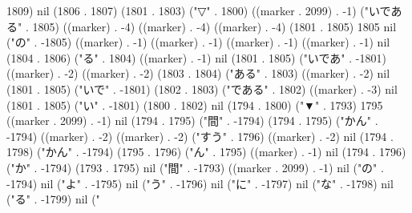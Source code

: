 1809) nil (1806 . 1807) (1801 . 1803) ("▽" . 1800) ((marker . 2099) . -1) ("いである" . 1805) ((marker) . -4) ((marker) . -4) ((marker) . -4) (1801 . 1805) 1805 nil ("の" . -1805) ((marker) . -1) ((marker) . -1) ((marker) . -1) ((marker) . -1) nil (1804 . 1806) ("る" . 1804) ((marker) . -1) nil (1801 . 1805) ("いであ" . -1801) ((marker) . -2) ((marker) . -2) (1803 . 1804) ("ある" . 1803) ((marker) . -2) nil (1801 . 1805) ("いで" . -1801) (1802 . 1803) ("である" . 1802) ((marker) . -3) nil (1801 . 1805) ("い" . -1801) (1800 . 1802) nil (1794 . 1800) ("▼" . 1793) 1795 ((marker . 2099) . -1) nil (1794 . 1795) ("間" . -1794) (1794 . 1795) ("かん" . -1794) ((marker) . -2) ((marker) . -2) ("すう" . 1796) ((marker) . -2) nil (1794 . 1798) ("かん" . -1794) (1795 . 1796) ("ん" . 1795) ((marker) . -1) nil (1794 . 1796) ("か" . -1794) (1793 . 1795) nil ("間" . -1793) ((marker . 2099) . -1) nil ("の" . -1794) nil ("よ" . -1795) nil ("う" . -1796) nil ("に" . -1797) nil ("な" . -1798) nil ("る" . -1799) nil ("
